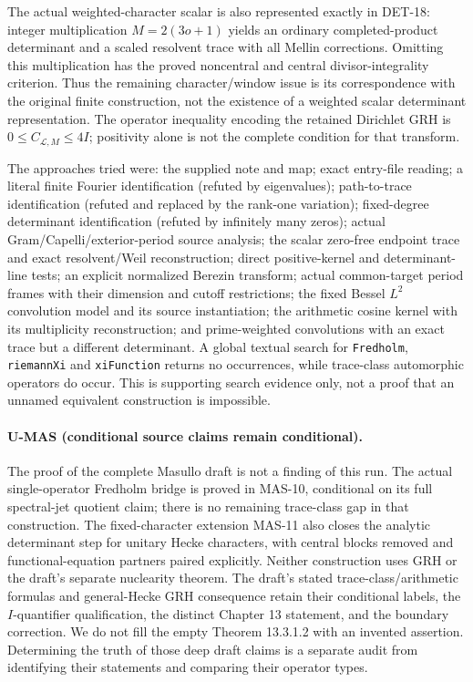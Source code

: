 \documentclass[11pt,a4paper]{article}
\newcommand{\fid}[1]{\textsf{#1}}
\begin{document}
The actual weighted-character scalar is also represented exactly in \fid{DET-18}: integer multiplication $M=2(3o+1)$ yields an ordinary completed-product determinant and a scaled resolvent trace with all Mellin corrections. Omitting this multiplication has the proved noncentral and central divisor-integrality criterion. Thus the remaining character/window issue is its correspondence with the original finite construction, not the existence of a weighted scalar determinant representation. The operator inequality encoding the retained Dirichlet GRH is $0\le C_{\mathcal L,M}\le4I$; positivity alone is not the complete condition for that transform.

The approaches tried were: the supplied note and map; exact entry-file reading; a literal finite Fourier identification (refuted by eigenvalues); path-to-trace identification (refuted and replaced by the rank-one variation); fixed-degree determinant identification (refuted by infinitely many zeros); actual Gram/Capelli/exterior-period source analysis; the scalar zero-free endpoint trace and exact resolvent/Weil reconstruction; direct positive-kernel and determinant-line tests; an explicit normalized Berezin transform; actual common-target period frames with their dimension and cutoff restrictions; the fixed Bessel $L^2$ convolution model and its source instantiation; the arithmetic cosine kernel with its multiplicity reconstruction; and prime-weighted convolutions with an exact trace but a different determinant. A global textual search for \texttt{Fredholm}, \texttt{riemannXi} and \texttt{xiFunction} returns no occurrences, while trace-class automorphic operators do occur. This is supporting search evidence only, not a proof that an unnamed equivalent construction is impossible.

\paragraph{U-MAS (conditional source claims remain conditional).}
The proof of the complete Masullo draft is not a finding of this run. The actual single-operator Fredholm bridge is proved in \fid{MAS-10}, conditional on its full spectral-jet quotient claim; there is no remaining trace-class gap in that construction. The fixed-character extension \fid{MAS-11} also closes the analytic determinant step for unitary Hecke characters, with central blocks removed and functional-equation partners paired explicitly. Neither construction uses GRH or the draft's separate nuclearity theorem. The draft's stated trace-class/arithmetic formulas and general-Hecke GRH consequence retain their conditional labels, the $I$-quantifier qualification, the distinct Chapter 13 statement, and the boundary correction. We do not fill the empty Theorem 13.3.1.2 with an invented assertion. Determining the truth of those deep draft claims is a separate audit from identifying their statements and comparing their operator types.
\end{document}
